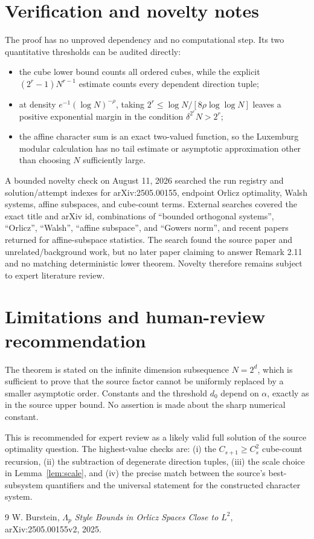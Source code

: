 \documentclass[11pt]{article}
\begin{document}
\section{Verification and novelty notes}

The proof has no unproved dependency and no computational step.  Its two
quantitative thresholds can be audited directly:
\begin{itemize}
\item the cube lower bound counts all ordered cubes, while the explicit
      $(2^r-1)N^{r-1}$ estimate counts every dependent direction tuple;
\item at density $e^{-1}(\log N)^{-\rho}$, taking
      $2^r\le \log N/[8\rho\log\log N]$ leaves a positive exponential
      margin in the condition $\delta^{2^r}N>2^r$;
\item the affine character sum is an exact two-valued function, so the
      Luxemburg modular calculation has no tail estimate or asymptotic
      approximation other than choosing $N$ sufficiently large.
\end{itemize}

A bounded novelty check on August 11, 2026 searched the run registry and
solution/attempt indexes for arXiv:2505.00155, endpoint Orlicz optimality,
Walsh systems, affine subspaces, and cube-count terms.  External searches
covered the exact title and arXiv id, combinations of ``bounded orthogonal
systems'', ``Orlicz'', ``Walsh'', ``affine subspace'', and ``Gowers norm'',
and recent papers returned for affine-subspace statistics.  The search found
the source paper and unrelated/background work, but no later paper claiming
to answer Remark 2.11 and no matching deterministic lower theorem.  Novelty
therefore remains subject to expert literature review.

\section{Limitations and human-review recommendation}

The theorem is stated on the infinite dimension subsequence $N=2^d$, which
is sufficient to prove that the source factor cannot be uniformly replaced
by a smaller asymptotic order.  Constants and the threshold $d_0$ depend on
$\alpha$, exactly as in the source upper bound.  No assertion is made about
the sharp numerical constant.

This is recommended for expert review as a likely valid full solution of the
source optimality question.  The highest-value checks are: (i) the
$C_{s+1}\ge C_s^2$ cube-count recursion, (ii) the subtraction of degenerate
direction tuples, (iii) the scale choice in Lemma~\ref{lem:scale}, and
(iv) the precise match between the source's best-subsystem quantifiers and
the universal statement for the constructed character system.

\begin{thebibliography}{9}
W. Burstein,
\emph{$\Lambda_p$ Style Bounds in Orlicz Spaces Close to $L^2$},
arXiv:2505.00155v2, 2025.
\end{thebibliography}
\end{document}
